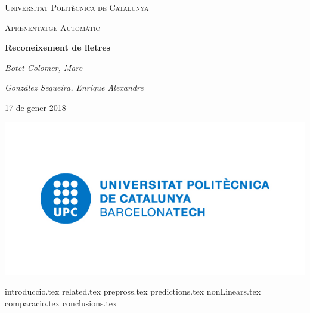 \documentclass[a4paper]{article}
\begin{document}
\begin{titlepage}
	\centering
	{\scshape\LARGE Universitat Politècnica de Catalunya \par}
	\vspace{1cm}
	{\scshape\Large Aprenentatge Automàtic\par}
	\vspace{1.5cm}
	{\huge\bfseries Reconeixement de lletres
    \par}
	\vspace{2cm}
	{\Large\itshape Botet Colomer, Marc\par}
	{\Large\itshape González Sequeira, Enrique Alexandre\par}
	\vspace{1cm}
	{\large 17 de gener 2018\par}
	\includegraphics[scale=0.5]{img/logo-vector-universitat-politecnica-catalunya.jpg}\par\vspace{1cm}
\end{titlepage}

\newenvironment{contents}
    {}
    {}
    
\setcounter{tocdepth}{2} 
\begin{contents}
    \tableofcontents
    \clearpage
\end{contents}



\newcommand*{\sectiondir}{sections/}

{introduccio.tex}
{related.tex}
{prepross.tex}
{predictions.tex}
{nonLinears.tex}
{comparacio.tex}
{conclusions.tex}

\printbibliography
\end{document}

